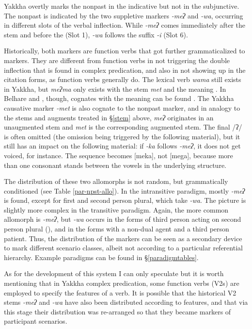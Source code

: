 Yakkha overtly marks the nonpast in the indicative but not in the subjunctive. The nonpast is indicated by the two suppletive markers \emph{-meʔ} and \emph{-wa}, occurring in different slots of the verbal inflection. While  \emph{-meʔ} comes immediately after the stem and before the  (Slot 1), \emph{-wa} follows the suffix \emph{-i}  (Slot 6). 

Historically, both markers are function verbs that got further grammaticalized to  markers. They are different from function verbs in not triggering the double inflection that is found in complex predication, and also in not showing up in the citation forms, as function verbs generally do. The lexical verb \emph{wama}  still exists in Yakkha, but \emph{meʔma} only exists with the stem \emph{met} and the meaning . In Belhare and , though, cognates with the meaning  can be found  \citep{Bickel1997Dictionary, Doornenbal2009A-grammar}. The Yakkha causative marker \emph{-met} is also cognate to the nonpast marker, and in analogy to the stems and augments treated in §\ref{stem} above,  \emph{meʔ} originates in an unaugmented stem and \emph{met} is the corresponding augmented stem. The final /ʔ/ is often omitted (the omission being triggered by the following material), but it still has an impact on the following material: if \emph{-ka} follows \emph{-meʔ}, it does not get voiced, for instance. The sequence becomes [meka], not [mega], because more than one consonant stands between the vowels  in the underlying structure.


The distribution of these two allomorphs is not random, but grammatically conditioned (see Table \ref{par-npst-allo}). In the intransitive paradigm, mostly \emph{-meʔ} is found, except for first and second person plural, which take \emph{-wa}. The picture is slightly more complex in the transitive paradigm. Again, the more common allomorph is \emph{-meʔ}, but \emph{-wa} occurs in the forms of third person acting on second person plural (), and in the forms with a non-dual agent and a third person patient. Thus, the distribution of the markers can be seen as  a secondary device to mark different scenario classes, albeit not according to a particular referential hierarchy.  Example paradigms can be found in §\ref{paradigmtables}. 

As for the development of this system I can only speculate but it is worth mentioning that in Yakkha complex predication, some function verbs (V2s) are employed to specify the  features of a verb. It is possible that the historical V2 stems \emph{-meʔ} and \emph{-wa} have also been distributed according to  features, and that via this stage their distribution was re-arranged so that they became markers of participant scenarios.


